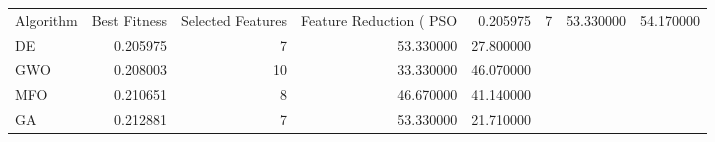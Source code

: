 \begin{tabular}{lrrrr}
\toprule
Algorithm & Best Fitness & Selected Features & Feature Reduction (%
\midrule
PSO & 0.205975 & 7 & 53.330000 & 54.170000 \\
DE & 0.205975 & 7 & 53.330000 & 27.800000 \\
GWO & 0.208003 & 10 & 33.330000 & 46.070000 \\
MFO & 0.210651 & 8 & 46.670000 & 41.140000 \\
GA & 0.212881 & 7 & 53.330000 & 21.710000 \\
\bottomrule
\end{tabular}
